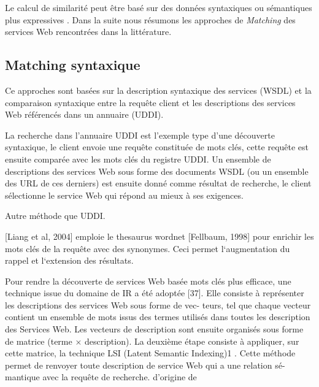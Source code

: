Le calcul de similarité peut être basé sur des données syntaxiques ou
sémantiques plus expressives \cite{elie2010}. Dans la suite nous
résumons les approches de \textit{Matching} des services Web
rencontrées dans la littérature.

  \subsection{Matching syntaxique}
  \label{sec:matching-syntactique}
  Ce approches sont basées sur la description syntaxique des services
  (\textsc{WSDL}) et la comparaison syntaxique entre la requête client
  et les descriptions des services Web référencés dans un annuaire
  (\textsc{UDDI)}.


  La recherche dans l'annuaire \textsc{UDDI} \cite{clement2004uddi}
  est l'exemple type d'une découverte syntaxique, le client envoie une
  requête constituée de mots clés, cette requête est ensuite comparée
  avec les mots clés du registre \textsc{UDDI}. Un ensemble de
  descriptions des services Web sous forme des documents \textsc{WSDL}
  (ou un ensemble des \textsc{URL} de ces derniers) est ensuite donné
  comme résultat de recherche, le client sélectionne le service Web
  qui répond au mieux à ses exigences.

  {\color{blue} Autre méthode que UDDI.

    [Liang et al, 2004] emploie le thesaurus wordnet [Fellbaum, 1998]
    pour enrichir les mots clés de la requête avec des synonymes. Ceci
    permet l‘augmentation du rappel et l‘extension des
    résultats. \cite{DBLP:journals/jwsr/LiangCSCL04}

    Pour rendre la découverte de services Web basée mots clés plus
    efficace, une technique issue du domaine de IR a été adoptée
    [37]. Elle consiste à représenter les descriptions des services
    Web sous forme de vec- teurs, tel que chaque vecteur contient un
    ensemble de mots issus des termes utilisés dans toutes les
    description des Services Web. Les vecteurs de description sont
    ensuite organisés sous forme de matrice (terme × description). La
    deuxième étape consiste à appliquer, sur cette matrice, la
    technique LSI (Latent Semantic Indexing)1 . Cette méthode permet
    de renvoyer toute description de service Web qui a une relation
    sé- mantique avec la requête de
    recherche.\cite{sajjanhar2004algorithm} d'origine de
    \cite{chelbabi2012decouverte}}

